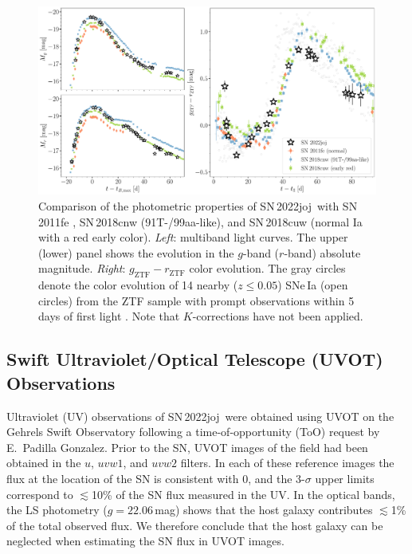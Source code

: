 \documentclass[twocolumn]{aastex631}
\newcommand{\sn}{SN\,2022joj}
\begin{document}
\begin{CJK*}{UTF8}{gbsn}
\begin{figure}
    \centering
    \includegraphics[width=\textwidth]{photometry.pdf}
    \caption{Comparison of the photometric properties of \sn\ with SN\,2011fe \citep[normal Ia;][]{Pereira_2013}, SN\,2018cnw (91T-/99aa-like), and SN\,2018cuw (normal Ia with a red early color). \textit{Left}: multiband light curves. The upper (lower) panel shows the evolution in the $g$-band ($r$-band) absolute magnitude.
    \textit{Right}: $g_\mathrm{ZTF}-r_\mathrm{ZTF}$ color evolution. 
    The gray circles denote the color evolution of 14 nearby ($z\le0.05$) SNe\,Ia (open circles) from the ZTF sample with prompt observations within 5\,days of first light \citep{Bulla2020}. Note that $K$-corrections have not been applied.}
    \label{fig:lc}
\end{figure}

\subsection{Swift Ultraviolet/Optical Telescope (UVOT) Observations}
Ultraviolet (UV) observations of \sn\ were obtained using UVOT \citep{UVOT_2005} on the Gehrels Swift Observatory \citep[Swift;][]{Swift_2004} following a time-of-opportunity (ToO) request by E.~Padilla Gonzalez. Prior to the SN, UVOT images of the field had been obtained in the $u$, $uvw1$, and $uvw2$ filters. In each of these reference images the flux at the location of the SN is consistent with 0, and the 3-$\sigma$ upper limits correspond to $\lesssim$10\% of the SN flux measured in the UV. In the optical bands, the LS photometry ($g = 22.06$\,mag) shows that the host galaxy contributes $\lesssim$1\% of the total observed flux. We therefore conclude that the host galaxy can be neglected when estimating the SN flux in UVOT images.


\end{CJK*}
\end{document}
